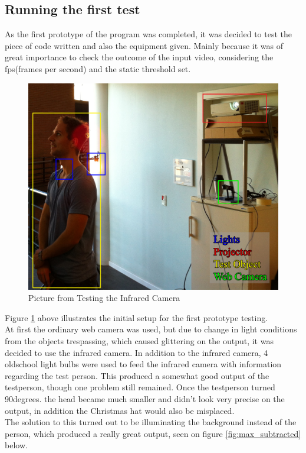 \subsection{Running the first test}
As the first prototype of the program was completed, it was decided to test the piece of code written and also the equipment given. Mainly because it was of great importance to check the outcome of the input video, considering the fps(frames per second) and the static threshold set. 

\begin{figure}[htbp]
\centering
\includegraphics[width=1.00\textwidth]{Pictures/Test/TestSetup.jpg}
\caption{Picture from Testing the Infrared Camera}
\label{fig:Picture from Testing the Infrared Camera}
\end{figure} 

Figure \ref{fig:Picture from Testing the Infrared Camera} above illustrates the initial setup for the first prototype testing. \\
At first the ordinary web camera was used, but due to change in light conditions from the objects trespassing, which caused glittering on the output, it was decided to use the infrared camera. In addition to the infrared camera, 4  oldschool light bulbs were used to  feed the infrared camera with information regarding the test person. This produced a somewhat good output of the testperson, though one problem still remained. Once the testperson turned 90degrees. the head became much smaller and didn't look very precise on the output, in addition the Christmas hat would also be misplaced.\\
The solution to this turned out to be illuminating the background instead of the person, which produced a really great output, seen on figure \ref{fig:max_subtracted} below.


